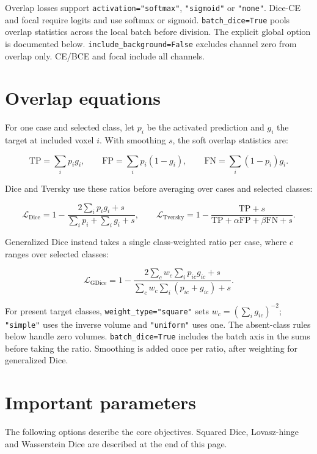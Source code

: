 Overlap losses support \texttt{activation="softmax"}, \texttt{"sigmoid"} or \texttt{"none"}. Dice-CE and focal
require logits and use softmax or sigmoid. \texttt{batch\_dice=True} pools overlap statistics across
the local batch before division. The explicit global option is documented below.
\texttt{include\_background=False} excludes channel zero from overlap only. CE/BCE and focal include
all channels.

\section{Overlap equations}\label{losses:overlap-equations}

For one case and selected class, let \(p_i\) be the activated prediction and \(g_i\) the target
at included voxel \(i\). With smoothing \(s\), the soft overlap statistics are:

\[
\mathrm{TP}=\sum_i p_i g_i,\qquad
\mathrm{FP}=\sum_i p_i(1-g_i),\qquad
\mathrm{FN}=\sum_i (1-p_i)g_i.
\]

Dice and Tversky use these ratios before averaging over cases and selected classes:

\[
\mathcal{L}_{\mathrm{Dice}}
=1-\frac{2\sum_i p_i g_i+s}{\sum_i p_i+\sum_i g_i+s},\qquad
\mathcal{L}_{\mathrm{Tversky}}
=1-\frac{\mathrm{TP}+s}{\mathrm{TP}+\alpha\mathrm{FP}+\beta\mathrm{FN}+s}.
\]

Generalized Dice instead takes a single class-weighted ratio per case, where \(c\) ranges
over selected classes:

\[
\mathcal{L}_{\mathrm{GDice}}
=1-\frac{2\sum_c w_c\sum_i p_{ic}g_{ic}+s}
{\sum_c w_c\sum_i(p_{ic}+g_{ic})+s}.
\]

For present target classes, \texttt{weight\_type="square"} sets \(w_c=(\sum_i g_{ic})^{-2}\);
\texttt{"simple"} uses the inverse volume and \texttt{"uniform"} uses one. The absent-class rules below
handle zero volumes. \texttt{batch\_dice=True} includes the batch axis in the sums before taking
the ratio. Smoothing is added once per ratio, after weighting for generalized Dice.

\section{Important parameters}\label{losses:important-parameters}

The following options describe the core objectives. Squared Dice, Lovasz-hinge and
Wasserstein Dice are described at the end of this page.

